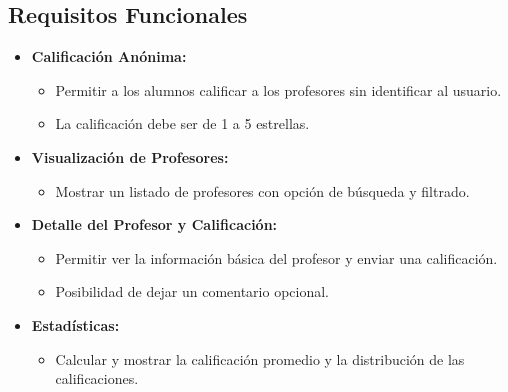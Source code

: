 \documentclass[11pt]{article}
\begin{document}
\subsection{Requisitos Funcionales}
\begin{itemize}
    \item \textbf{Calificación Anónima:}
    \begin{itemize}
        \item Permitir a los alumnos calificar a los profesores sin identificar al usuario.
        \item La calificación debe ser de 1 a 5 estrellas.
    \end{itemize}
    \item \textbf{Visualización de Profesores:}
    \begin{itemize}
        \item Mostrar un listado de profesores con opción de búsqueda y filtrado.
    \end{itemize}
    \item \textbf{Detalle del Profesor y Calificación:}
    \begin{itemize}
        \item Permitir ver la información básica del profesor y enviar una calificación.
        \item Posibilidad de dejar un comentario opcional.
    \end{itemize}
    \item \textbf{Estadísticas:}
    \begin{itemize}
        \item Calcular y mostrar la calificación promedio y la distribución de las calificaciones.
    \end{itemize}
\end{itemize}
\end{document}
